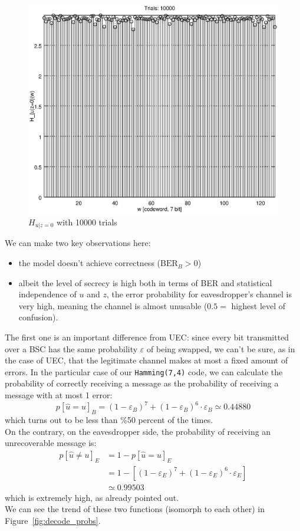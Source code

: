 \documentclass[a4paper,12pt,titlepage]{article}
\begin{document}
\begin{figure}[h]
  \centering
  \includegraphics[scale=0.8]{bsc__0_125__0_429__10000.eps}
  \caption{$H_{u|z=0}$ with 10000 trials}
  \label{fig:bsc_Hudz}
\end{figure}

We can make two key observations here:
\begin{itemize}
  \item the model doesn't achieve correctness ($\text{BER}_B > 0$)
  \item albeit the level of secrecy is high both in terms of BER and
  statistical independence of $u$ and $z$, the error probability for
  eavesdropper's channel is very high, meaning the channel is almost unusable
  ($0.5 =$ highest level of confusion).
\end{itemize}

The first one is an important difference from UEC: since every bit transmitted
over a BSC has the same probability $\varepsilon$ of being swapped, we can't be
sure, as in the case of UEC, that the legitimate channel makes at most a fixed
amount of errors. In the particular case of our \texttt{Hamming(7,4)} code, we
can calculate the probability of correctly receiving a message as the
probability of receiving a message with at most 1 error:
\[
  p[\hat{u} = u]_B = (1 - \varepsilon_B)^7 + (1 - \varepsilon_B)^6 \cdot \varepsilon_B
  \simeq 0.44880
\]
which turns out to be less than \%50 percent of the times. \\
On the contrary, on the eavesdropper side, the probability of receiving an
unrecoverable message is:
\begin{align*}
  p[\hat{u} \neq u]_E &= 1 - p[\hat{u} = u]_E \\
  &= 1 - [(1 - \varepsilon_E)^7 + (1 - \varepsilon_E)^6 \cdot \varepsilon_E] \\
  &\simeq 0.99503
\end{align*}
which is extremely high, as already pointed out. \\
We can see the trend of these two functions (isomorph to each other) in
Figure~\ref{fig:decode_probs}.
\end{document}
